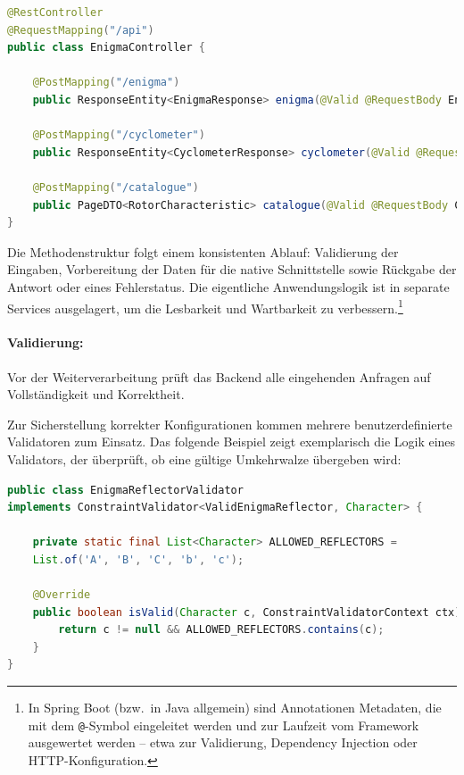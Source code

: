 \documentclass[12pt, ngerman, a4paper, numbers=noenddot]{article}
\begin{document}
\begin{lstlisting}[language=Java, caption={Ausschnitt aus dem EnigmaController}, label=lst:enigma-controller]
@RestController
@RequestMapping("/api")
public class EnigmaController {
	
	@PostMapping("/enigma")
	public ResponseEntity<EnigmaResponse> enigma(@Valid @RequestBody EnigmaRequest req) {...}
	
	@PostMapping("/cyclometer")
	public ResponseEntity<CyclometerResponse> cyclometer(@Valid @RequestBody ManualCyclometerRequest req) {...}
	
	@PostMapping("/catalogue")
	public PageDTO<RotorCharacteristic> catalogue(@Valid @RequestBody CatalogueRequest req) {...}
}
\end{lstlisting}

Die Methodenstruktur folgt einem konsistenten Ablauf: Validierung der Eingaben, Vorbereitung der Daten für die native Schnittstelle sowie Rückgabe der Antwort oder eines Fehlerstatus. Die eigentliche Anwendungslogik ist in separate Services ausgelagert, um die Lesbarkeit und Wartbarkeit zu verbessern.\footnote{%
	In Spring Boot (bzw.\ in Java allgemein) sind Annotationen Metadaten, die mit dem \lstinline|@|-Symbol eingeleitet werden und zur Laufzeit vom Framework ausgewertet werden – etwa zur Validierung, Dependency Injection oder HTTP-Konfiguration.%
}





\paragraph{Validierung:}

Vor der Weiterverarbeitung prüft das Backend alle eingehenden Anfragen auf Vollständigkeit und Korrektheit.

Zur Sicherstellung korrekter Konfigurationen kommen mehrere benutzerdefinierte Validatoren zum Einsatz. Das folgende Beispiel zeigt exemplarisch die Logik eines Validators, der überprüft, ob eine gültige Umkehrwalze übergeben wird:

\begin{lstlisting}[language=Java, caption={Validierung zulässiger Umkehrwalzen}, label=lst:reflector-validator]
public class EnigmaReflectorValidator 
implements ConstraintValidator<ValidEnigmaReflector, Character> {
	
	private static final List<Character> ALLOWED_REFLECTORS = 
	List.of('A', 'B', 'C', 'b', 'c');
	
	@Override
	public boolean isValid(Character c, ConstraintValidatorContext ctx) {
		return c != null && ALLOWED_REFLECTORS.contains(c);
	}
}
\end{lstlisting}
\end{document}
